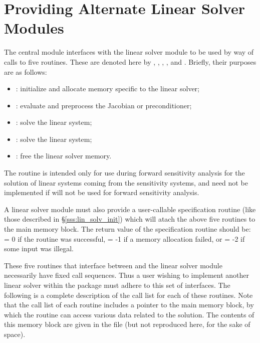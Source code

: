 \chapter{Providing Alternate Linear Solver Modules}\label{s:new_linsolv}
The central {\cvodes} module interfaces with the linear solver module to be
used by way of calls to five routines.  These are denoted here by 
, , , , and .
Briefly, their purposes are as follows:
\begin{itemize}
\item {}: initialize and allocate memory specific to the
linear solver;
\item {}: evaluate and preprocess the Jacobian or preconditioner;
\item {}: solve the linear system;
\item {}: solve the linear system;
\item {}: free the linear solver memory.
\end{itemize}
The  routine is intended only for use during forward sensitivity
analysis for the solution of linear systems coming from the sensitivity
systems, and need not be implemented if {\cvodes} will not be used for 
forward sensitivity analysis.

A linear solver module must also provide a user-callable specification routine
(like those described in \S\ref{sss:lin_solv_init}) which will atach the above five 
routines to the main {\cvodes} memory block. The return value of the specification 
routine should be:  = 0 if the routine was successful,
 = -1 if a memory allocation failed, or  = -2
if some input was illegal.

These five routines that interface between {\cvodes} and the linear solver module
necessarily have fixed call sequences.  Thus a user wishing to implement another 
linear solver within the {\cvodes} package must adhere to this set of interfaces.
The following is a complete description of the call list for each of
these routines.  Note that the call list of each routine includes a
pointer to the main {\cvodes} memory block, by which the routine can access
various data related to the {\cvodes} solution.  The contents of this memory
block are given in the file  (but not reproduced here, for
the sake of space).

